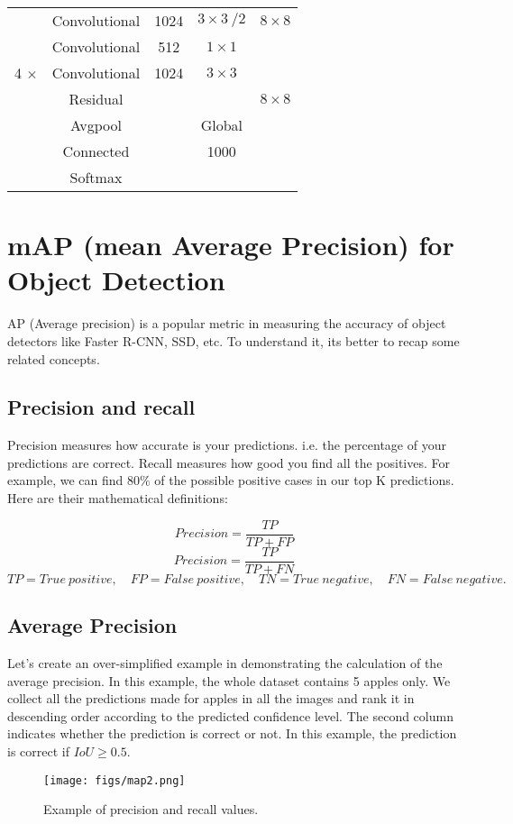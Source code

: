 \begin{table}[!htpb]
\begin{tabular}{@{}ccccc@{}}
  \cmidrule{2-5}
  &           Convolutional     & 1024                & $3 \times 3 \ \text{/} 2$   & $8 \times 8$ \\
  \cmidrule{2-5}
  &           Convolutional     & 512                 & $1 \times 1$   &  \\
  4 $\times$&           Convolutional     & 1024                 & $3 \times 3$   &  \\
  &           Residual          &                    &                & $8 \times 8$ \\
  \cmidrule{2-5}
  &           Avgpool           &                    &Global      & \\
  &           Connected           &                    &1000      & \\
  &Softmax & & & \\
  \bottomrule[1.5pt]
\end{tabular}
\end{table}

\chapter[mAP for Object Detection]{mAP (mean Average Precision) for Object Detection}
AP (Average precision) is a popular metric in measuring the accuracy of object detectors like Faster R-CNN, SSD, etc. To understand it, its better to recap some related concepts.

\section{Precision and recall}
Precision measures how accurate is your predictions. i.e. the percentage of your predictions are correct.
Recall measures how good you find all the positives. For example, we can find 80\% of the possible positive cases in our top K predictions.
Here are their mathematical definitions:

$$
Precision = \frac{TP}{TP + FP}
$$
$$
Precision = \frac{TP}{TP + FN}
$$
$$
TP = True\ positive, \quad
FP = False\ positive, \quad
TN = True\ negative, \quad
FN = False\ negative.
$$

\section{Average Precision}
Let’s create an over-simplified example in demonstrating the calculation of the average precision. In this example, the whole dataset contains 5 apples only. We collect all the predictions made for apples in all the images and rank it in descending order according to the predicted confidence level. The second column indicates whether the prediction is correct or not. In this example, the prediction is correct if $IoU \geq 0.5$.
\begin{figure}[ht]
	\centering
	\texttt{[image: figs/map2.png]}
	\caption{Example of precision and recall values.}\label{fig:map2}
\end{figure}

